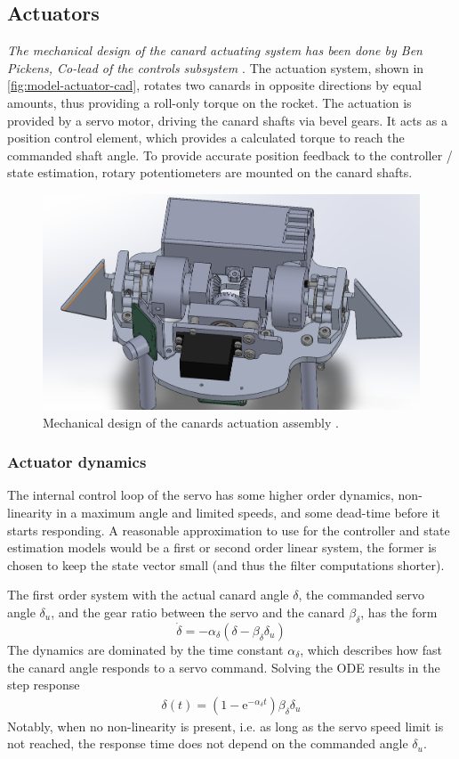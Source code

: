 \subsection{Actuators}
\textit{The mechanical design of the canard actuating system has been done by Ben Pickens, Co-lead of the controls subsystem \cite{team-controls-ben}}.
The actuation system, shown in \autoref{fig:model-actuator-cad}, rotates two canards in opposite directions by equal amounts, thus providing a roll-only torque on the rocket.
The actuation is provided by a servo motor, driving the canard shafts via bevel gears.
It acts as a position control element, which provides a calculated torque to reach the commanded shaft angle. 
To provide accurate position feedback to the controller / state estimation, rotary potentiometers are mounted on the canard shafts.
\begin{figure}[ht]
    \centering
    \includegraphics[width=0.6\linewidth]{images-design/actuator_cad.png}
    \caption[Mechanical design of the actuator]{Mechanical design of the canards actuation assembly \cite{team-controls-ben}.}
    \label{fig:model-actuator-cad}
\end{figure}

\subsubsection{Actuator dynamics}
The internal control loop of the servo has some higher order dynamics, non-linearity in a maximum angle and limited speeds, and some dead-time before it starts responding.
A reasonable approximation to use for the controller and state estimation models would be a first or second order linear system, the former is chosen to keep the state vector small (and thus the filter computations shorter).

The first order system with the actual canard angle $\delta$, the commanded servo angle $\delta_u$, and the gear ratio between the servo and the canard $\beta_\delta$, has the form
\begin{equation}
    \dot \delta = -\alpha_\delta (\delta - \beta_\delta\delta_u)
\end{equation}
The dynamics are dominated by the time constant $\alpha_\delta$, which describes how fast the canard angle responds to a servo command. 
Solving the ODE results in the step response
\begin{align}
    \delta(t) = (1-\mathrm{e}^{-\alpha_\delta t}) \beta_\delta \delta_u
\end{align}
Notably, when no non-linearity is present, i.e. as long as the servo speed limit is not reached, the response time does not depend on the commanded angle $\delta_u$.

